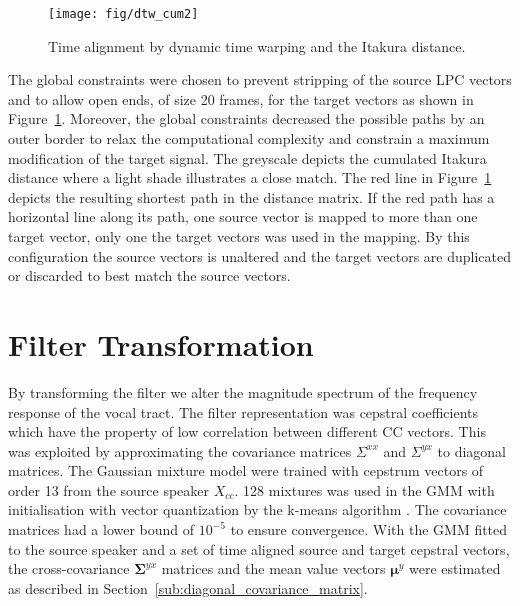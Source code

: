 \begin{figure}[htbp]
	\begin{center}
		\texttt{[image: fig/dtw\_cum2]}
		\caption{Time alignment by dynamic time warping and the Itakura distance.}
		\label{fig:dtw}
	\end{center}
\end{figure}
The global constraints were chosen to prevent stripping of the source LPC vectors and to allow open ends, of size 20 frames, for the target vectors as shown in Figure~\ref{fig:dtw}. Moreover, the global constraints decreased the possible paths by an outer border to relax the computational complexity and constrain a maximum modification of the target signal. The greyscale depicts the cumulated Itakura distance where a light shade illustrates a close match. The red line in Figure~\ref{fig:dtw} depicts the resulting shortest path in the distance matrix. If the red path has a horizontal line along its path, \ie one source vector is mapped to more than one target vector, only one the target vectors was used in the mapping. By this configuration the source vectors is unaltered and the target vectors are duplicated or discarded to best match the source vectors.



\section{Filter Transformation} %
\label{sec:filter_transformation}

By transforming the filter we alter the magnitude spectrum of the frequency response of the vocal tract. The filter representation was cepstral coefficients which have the property of low correlation between different CC vectors. This was exploited by approximating the covariance matrices $\Sigma^{xx}$ and $\Sigma^{yx}$ to diagonal matrices. The Gaussian mixture model were trained with cepstrum vectors of order 13 from the source speaker $X_{cc}$. 128 mixtures was used in the GMM with initialisation with vector quantization by the k-means algorithm \cite{linde80}. The covariance matrices had a lower bound of $10^{-5}$ to ensure convergence. With the GMM fitted to the source speaker and a set of time aligned source and target cepstral vectors, the cross-covariance $\mathbf{\Sigma}^{yx}$ matrices and the mean value vectors $\boldsymbol{\mu}^y$ were estimated as described in Section~\ref{sub:diagonal_covariance_matrix}.

